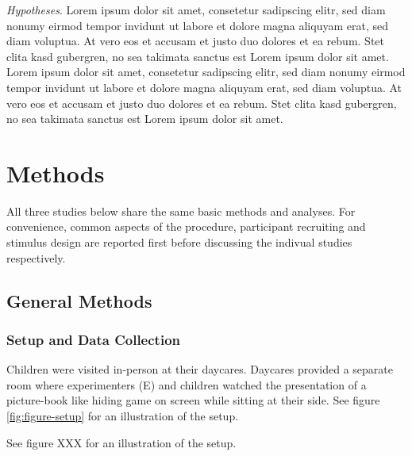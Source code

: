 \documentclass[
  man]{apa6}
\begin{document}
\emph{Hypotheses}. Lorem ipsum dolor sit amet, consetetur sadipscing elitr, sed diam nonumy eirmod tempor invidunt ut labore et dolore magna aliquyam erat, sed diam voluptua. At vero eos et accusam et justo duo dolores et ea rebum. Stet clita kasd gubergren, no sea takimata sanctus est Lorem ipsum dolor sit amet. Lorem ipsum dolor sit amet, consetetur sadipscing elitr, sed diam nonumy eirmod tempor invidunt ut labore et dolore magna aliquyam erat, sed diam voluptua. At vero eos et accusam et justo duo dolores et ea rebum. Stet clita kasd gubergren, no sea takimata sanctus est Lorem ipsum dolor sit amet.

\section{Methods}\label{methods}

All three studies below share the same basic methods and analyses. For convenience, common aspects of the procedure, participant recruiting and stimulus design are reported first before discussing the indivual studies respectively.

\subsection{General Methods}\label{general-methods}

\subsubsection{Setup and Data Collection}\label{setup-and-data-collection}

Children were visited in-person at their daycares. Daycares provided a separate room where experimenters (E) and children watched the presentation of a picture-book like hiding game on screen while sitting at their side. See figure \ref{fig:figure-setup} for an illustration of the setup.

See figure XXX for an illustration of the setup.
\end{document}
